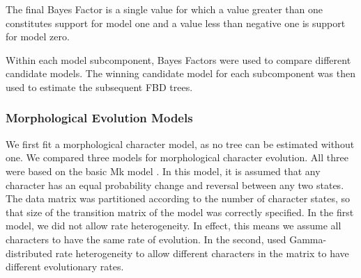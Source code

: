 \documentclass{article}
\begin{document}
The final Bayes Factor is a single value for which a value greater than one constitutes support for model one and a value less than negative one is support for model zero. 

 Within each model subcomponent, Bayes Factors were used to compare different candidate models. 
The winning candidate model for each subcomponent was then used to estimate the subsequent FBD trees.

\subsubsection{Morphological Evolution Models}
We first fit a morphological character model, as no tree can be estimated without one.
We compared three models for morphological character evolution. 
All three were based on the basic Mk model \citep{Lewis2001}. 
In this model, it is assumed that any character has an equal probability change and reversal between any two states. 
The data matrix was partitioned according to the number of character states, so that size of the transition matrix of the model was correctly specified.
In the first model, we did not allow rate heterogeneity. 
In effect, this means we assume all characters to have the same rate of evolution.
In the second, used Gamma-distributed rate heterogeneity to allow different characters in the matrix to have different evolutionary rates.
\end{document}
